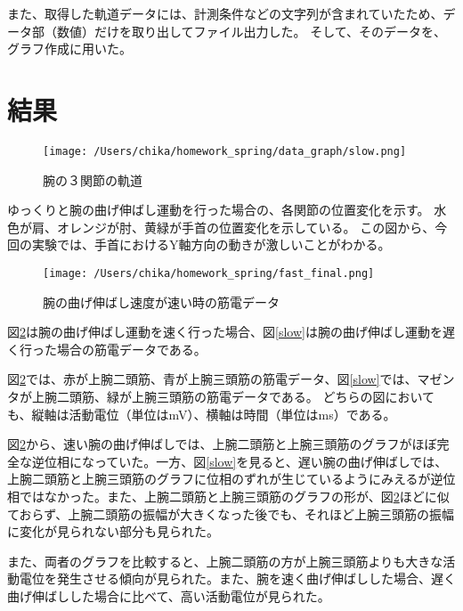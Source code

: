 \documentclass{jsarticle}
\begin{document}
また、取得した軌道データには、計測条件などの文字列が含まれていたため、データ部（数値）だけを取り出してファイル出力した。
そして、そのデータを、グラフ作成に用いた。

\clearpage
\section{結果}

\begin{figure}[h]
  \begin{center} %
    \texttt{[image: /Users/chika/homework\_spring/data\_graph/slow.png]}
    \caption{腕の３関節の軌道} %
    \label{kidou} %
  \end{center}
\end{figure}
ゆっくりと腕の曲げ伸ばし運動を行った場合の、各関節の位置変化を示す。
水色が肩、オレンジが肘、黄緑が手首の位置変化を示している。
この図から、今回の実験では、手首におけるY軸方向の動きが激しいことがわかる。

\begin{figure}[!h]
\begin{center}
\texttt{[image: /Users/chika/homework\_spring/fast\_final.png]}
\caption{腕の曲げ伸ばし速度が速い時の筋電データ}
\label{fast}
\end{center}
\end{figure}

図\ref{fast}は腕の曲げ伸ばし運動を速く行った場合、図\ref{slow}は腕の曲げ伸ばし運動を遅く行った場合の筋電データである。

図\ref{fast}では、赤が上腕二頭筋、青が上腕三頭筋の筋電データ、図\ref{slow}では、マゼンタが上腕二頭筋、緑が上腕三頭筋の筋電データである。
どちらの図においても、縦軸は活動電位（単位はmV）、横軸は時間（単位はms）である。

図\ref{fast}から、速い腕の曲げ伸ばしでは、上腕二頭筋と上腕三頭筋のグラフがほぼ完全な逆位相になっていた。一方、図\ref{slow}を見ると、遅い腕の曲げ伸ばしでは、上腕二頭筋と上腕三頭筋のグラフに位相のずれが生じているようにみえるが逆位相ではなかった。また、上腕二頭筋と上腕三頭筋のグラフの形が、図\ref{fast}ほどに似ておらず、上腕二頭筋の振幅が大きくなった後でも、それほど上腕三頭筋の振幅に変化が見られない部分も見られた。

また、両者のグラフを比較すると、上腕二頭筋の方が上腕三頭筋よりも大きな活動電位を発生させる傾向が見られた。また、腕を速く曲げ伸ばしした場合、遅く曲げ伸ばしした場合に比べて、高い活動電位が見られた。
\end{document}
